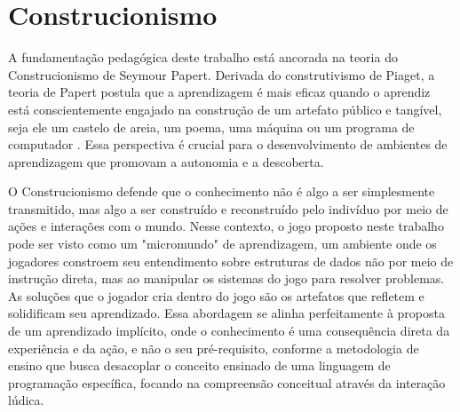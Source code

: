 \section{Construcionismo}

A fundamentação pedagógica deste trabalho está ancorada na teoria do
Construcionismo de Seymour Papert. Derivada do construtivismo de Piaget, a
teoria de Papert postula que a aprendizagem é mais eficaz quando o aprendiz está
conscientemente engajado na construção de um artefato público e tangível, seja
ele um castelo de areia, um poema, uma máquina ou um programa de computador
\cite{papert1993children}. Essa perspectiva é crucial para o desenvolvimento de
ambientes de aprendizagem que promovam a autonomia e a descoberta.

O Construcionismo defende que o conhecimento não é algo a ser simplesmente
transmitido, mas algo a ser construído e reconstruído pelo indivíduo por meio
de ações e interações com o mundo. Nesse contexto, o jogo proposto neste
trabalho pode ser visto como um "micromundo" de aprendizagem, um ambiente onde
os jogadores constroem seu entendimento sobre estruturas de dados não por meio
de instrução direta, mas ao manipular os sistemas do jogo para resolver
problemas. As soluções que o jogador cria dentro do jogo são os artefatos que
refletem e solidificam seu aprendizado. Essa abordagem se alinha perfeitamente
à proposta de um aprendizado implícito, onde o conhecimento é uma consequência
direta da experiência e da ação, e não o seu pré-requisito, conforme a
metodologia de ensino que busca desacoplar o conceito ensinado de uma linguagem
de programação específica, focando na compreensão conceitual através da
interação lúdica.
